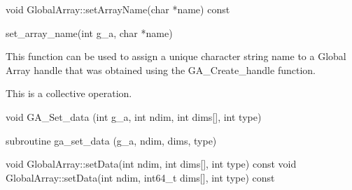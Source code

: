 \documentclass[12pt]{article}
\begin{document}
\begin{cxxapi}
\begin{cxxcode}
void GlobalArray::setArrayName(char *name) const
\end{cxxcode}
\begin{funcargs}
\end{funcargs}
\end{cxxapi}

\begin{pyapi}
\begin{pycode}
set_array_name(int g_a, char *name)
\end{pycode}
\end{pyapi}
\gcoll

\begin{desc}

  This function can be used to assign a unique character string name
  to a Global Array handle that was obtained using the
  GA_Create_handle function.

  This is a collective operation.

\end{desc}



\begin{capi}
\begin{ccode}
void GA_Set_data (int g_a, int ndim, int dims[], int type)
\end{ccode}
\begin{funcargs}
\end{funcargs}
\end{capi}

\begin{fapi}
\begin{fcode}
subroutine ga_set_data (g_a, ndim, dims, type)
\end{fcode}
\begin{funcargs}
\end{funcargs}
\end{fapi}

\begin{cxxapi}
\begin{cxxcode}
void GlobalArray::setData(int ndim, int dims[], int type) const
void GlobalArray::setData(int ndim, int64_t dims[], int type) const
\end{cxxcode}
\begin{funcargs}
\end{funcargs}
\end{cxxapi}
\end{document}
